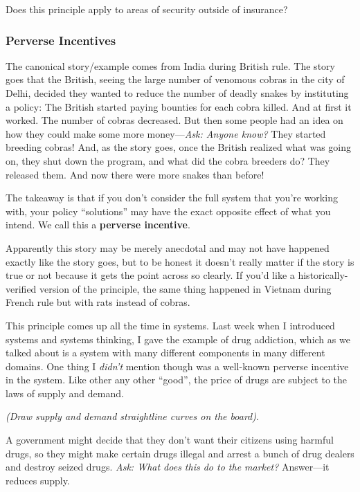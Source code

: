 \documentclass[11pt]{article}
\begin{document}
Does this principle apply to areas of security outside of insurance?

\subsubsection{Perverse Incentives}

The canonical story/example comes from India during British rule. The story goes that the British, seeing the large number of venomous cobras in the city of Delhi, decided they wanted to reduce the number of deadly snakes by instituting a policy: The British started paying bounties for each cobra killed. And at first it worked. The number of cobras decreased. But then some people had an idea on how they could make some more money---{\it Ask: Anyone know?} They started breeding cobras! And, as the story goes, once the British realized what was going on, they shut down the program, and what did the cobra breeders do? They released them. And now there were more snakes than before!

The takeaway is that if you don't consider the full system that you're working with, your policy ``solutions'' may have the exact opposite effect of what you intend. We call this a {\bf perverse incentive}.

Apparently this story may be merely anecdotal and may not have happened exactly like the story goes, but to be honest it doesn't really matter if the story is true or not because it gets the point across so clearly. If you'd like a historically-verified version of the principle, the same thing happened in Vietnam during French rule but with rats instead of cobras.

This principle comes up all the time in systems. Last week when I introduced systems and systems thinking, I gave the example of drug addiction, which as we talked about is a system with many different components in many different domains. One thing I {\it didn't} mention though was a well-known perverse incentive in the system. Like other any other ``good'', the price of drugs are subject to the laws of supply and demand. %

{\it (Draw supply and demand straightline curves on the board)}. 

A government might decide that they don't want their citizens using harmful drugs, so they might make certain drugs illegal and arrest a bunch of drug dealers and destroy seized drugs. {\it Ask: What does this do to the market?} Answer---it reduces supply.
\end{document}
